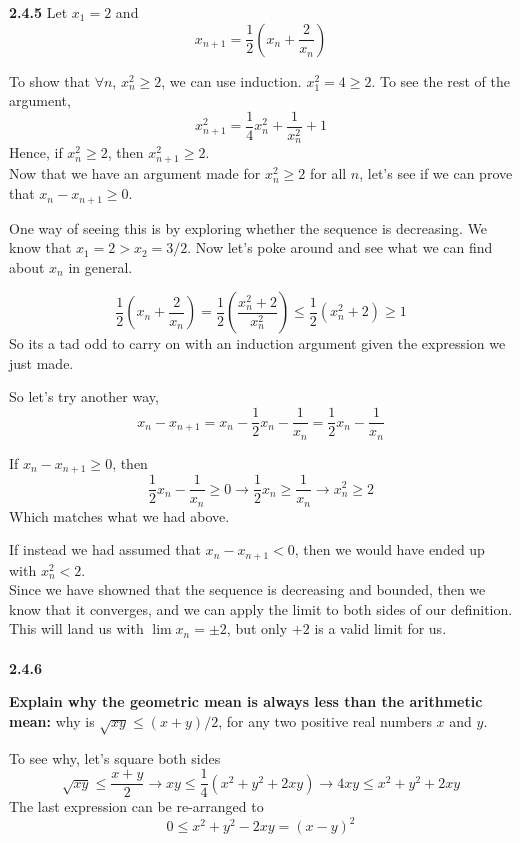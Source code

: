 \textbf{2.4.5}
Let $x_1 = 2$ and
$$
x_{n+1} = \frac{1}{2}\left( x_n + \frac{2}{x_n} \right)
$$

To show that $\forall n$, $x^{2}_{n} \geq 2$, we can use induction.
$x^{2}_{1} = 4 \geq 2$.
To see the rest of the argument,
$$
x^{2}_{n+1} = \frac{1}{4}x^{2}_{n} + \frac{1}{x^{2}_{n}} + 1
$$
Hence, if $x^{2}_{n} \geq 2$, then $x^{2}_{n+1} \geq 2$.
\\

Now that we have an argument made for $x^{2}_{n} \geq 2$ for all $n$, let's see if we can prove that
$x_n - x_{n+1} \geq 0$.

One way of seeing this is by exploring whether the sequence is decreasing.
We know that $x_1 = 2 > x_2 = 3/2$.
Now let's poke around and see what we can find about $x_n$ in general.

$$
\frac{1}{2}\left(x_n + \frac{2}{x_n}\right) = \frac{1}{2}\left(\frac{x^{2}_{n} +2}{x^{2}_{n}}\right) 
\leq \frac{1}{2} (x^{2}_{n} + 2) \geq 1
$$
So its a tad odd to carry on with an induction argument given the expression we just made.

So let's try another way,
$$
x_n - x_{n+1} = x_n - \frac{1}{2}x_n - \frac{1}{x_n} = \frac{1}{2}x_n - \frac{1}{x_n}
$$

If $x_n - x_{n+1} \geq 0$, then
$$
\frac{1}{2}x_n - \frac{1}{x_n} \geq 0
\rightarrow \frac{1}{2}x_n \geq \frac{1}{x_n}
\rightarrow x^{2}_{n} \geq 2
$$
Which matches what we had above.

If instead we had assumed that $x_n - x_{n+1} < 0$, then we would have ended up with $x^{2}_{n} < 2$.
\\

Since we have showned that the sequence is decreasing and bounded, then we know that it converges, and we
can apply the limit to both sides of our definition.
This will land us with $\lim x_n = \pm 2$, but only $+2$ is a valid limit for us.
\\~\\



\textbf{2.4.6}

\textbf{Explain why the geometric mean is always less than the arithmetic mean:} why is
$\sqrt{xy} \leq (x+y)/2$, for any two positive real numbers $x$ and $y$.

To see why, let's square both sides
$$
\sqrt{xy} \leq \frac{x+y}{2} \rightarrow xy \leq \frac{1}{4} (x^2 + y^2 + 2xy)
\rightarrow 4xy \leq x^2 + y^2 + 2xy
$$
The last expression can be re-arranged to
$$
0 \leq x^2 + y^2 - 2xy = (x - y)^2
$$

